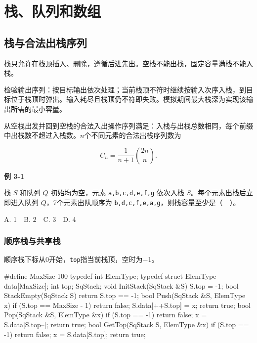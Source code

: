 \chapter{栈、队列和数组}\label{DS03}

\section{栈与合法出栈序列}\label{DS03-stack}

栈只允许在栈顶插入、删除，遵循后进先出。空栈不能出栈，固定容量满栈不能入栈。

检验输出序列：按目标输出依次处理；当前栈顶不符时继续按输入次序入栈，到目标位于栈顶时弹出。输入耗尽且栈顶仍不符即失败。模拟期间最大栈深为实现该输出所需的最小容量。

从空栈出发并回到空栈的合法入出操作序列满足：入栈与出栈总数相同，每个前缀中出栈数不超过入栈数。\(n\)个不同元素的合法出栈序列数为

\[C_n=\frac1{n+1}\binom{2n}{n}.\]

\par\medskip{}\noindent\hypertarget{DS03-E01}{}\label{DS03-E01}\textbf{例 3-1}\par\nobreak\smallskip

栈 \(S\) 和队列 \(Q\) 初始均为空，元素 \texttt{a,\allowbreak{}b,\allowbreak{}c,\allowbreak{}d,\allowbreak{}e,\allowbreak{}f,\allowbreak{}g} 依次入栈 \(S\)。每个元素出栈后立即进入队列 \(Q\)，7个元素出队顺序为 \texttt{b,\allowbreak{}d,\allowbreak{}c,\allowbreak{}f,\allowbreak{}e,\allowbreak{}a,\allowbreak{}g}，则栈容量至少是（　）。

A. 1　B. 2　C. 3　D. 4

\subsection{顺序栈与共享栈}\label{DS03-stack-code}

顺序栈下标从0开始，\texttt{top}指当前栈顶，空时为\ensuremath{-}1。

\par\smallskip\noindent\begin{minipage}{\linewidth}
\begin{codeblock}[language={C++}]
#define MaxSize 100
typedef int ElemType;
typedef struct {
    ElemType data[MaxSize];
    int top;
} SqStack;
void InitStack(SqStack &S) { S.top = -1; }
bool StackEmpty(SqStack S) { return S.top == -1; }
bool Push(SqStack &S, ElemType x) {
    if (S.top == MaxSize - 1) return false;
    S.data[++S.top] = x;
    return true;
}
bool Pop(SqStack &S, ElemType &x) {
    if (S.top == -1) return false;
    x = S.data[S.top--];
    return true;
}
bool GetTop(SqStack S, ElemType &x) {
    if (S.top == -1) return false;
    x = S.data[S.top];
    return true;
}
\end{codeblock}
\end{minipage}\par\smallskip

